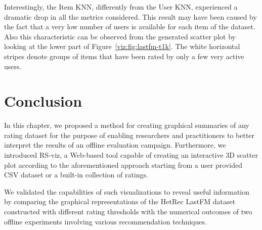 Interestingly, the Item KNN, differently from the User KNN, experienced a dramatic drop in all the metrics considered. This result may have been caused by the fact that a very low number of users is available for each item of the dataset. Also this characteristic can be observed from the generated scatter plot by looking at the lower part of Figure~\ref{viz:fig:lastfm-t1k}. The white horizontal stripes denote groups of items that have been rated by only a few very active users.

\section{Conclusion}
\label{viz:sec:conclusion}

In this chapter, we proposed a method for creating graphical summaries of any rating dataset for the purpose of enabling researchers and practitioners to better interpret the results of an offline evaluation campaign. Furthermore, we introduced RS-viz, a Web-based tool capable of creating an interactive 3D scatter plot according to the aforementioned approach starting from a user provided CSV dataset or a built-in collection of ratings.

We validated the capabilities of such visualizations to reveal useful information by comparing the graphical representations of the HetRec LastFM dataset constructed with different rating thresholds with the numerical outcomes of two offline experiments involving various recommendation techniques.
